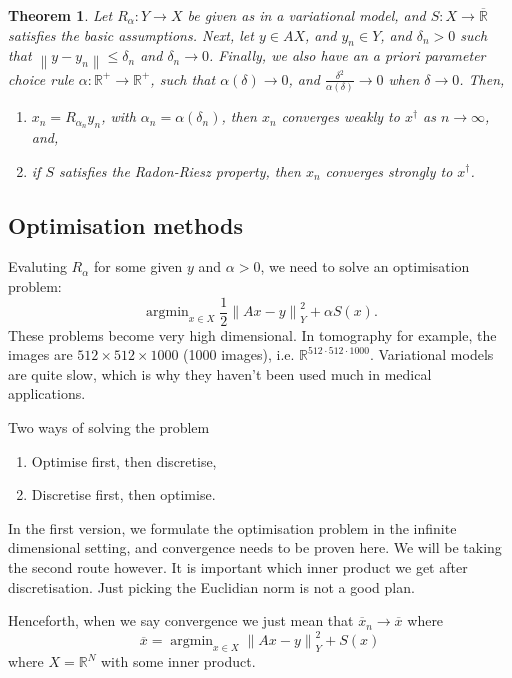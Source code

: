 \documentclass[12pt]{article}
\newtheorem{theorem}{Theorem}[section]
\theoremstyle{definition}
\newcommand{\real}{\mathbb{R}}   %
\DeclareMathOperator{\argmin}{argmin}
\newcommand\norm[1]{\left\lVert#1\right\rVert}
\begin{document}
\begin{theorem}
    Let $R_\alpha:Y\to X$ be given as in a variational model, and $S:X\to \overline{\real}$ satisfies the basic assumptions. Next, let $y\in AX$, and $y_n\in Y$, and $\delta_n>0$ such that $\norm{y-y_n}\leq \delta_n$ and $\delta_n\to 0$. Finally, we also have an a priori parameter choice rule $\alpha:\real^+\to \real^+$, such that $\alpha(\delta)\to 0$, and $\frac{\delta^2}{\alpha(\delta)}\to 0$ when $\delta \to 0$. Then, 
    \begin{enumerate}[label=(\alph*)]
        \item $x_n=R_{\alpha_n}y_n$, with $\alpha_n = \alpha(\delta_n)$, then $x_n$ converges weakly to $x^\dagger $ as $n\to \infty$, and,
        \item if $S$ satisfies the Radon-Riesz property, then $x_n$ converges strongly to $x^\dagger $.
    \end{enumerate}
\end{theorem}

\subsection{Optimisation methods}
Evaluting $R_\alpha$ for some given $y$ and $\alpha>0$, we need to solve an optimisation problem:
\begin{equation*}
    \argmin_{x\in X} \frac{1}{2}\norm{Ax-y}_Y^2 + \alpha S(x).
\end{equation*}
These problems become very high dimensional. In tomography for example, the images are $512\times 512\times 1000$ (1000 images), i.e. $\real^{512\cdot512\cdot1000}$. Variational models are quite slow, which is why they haven't been used much in medical applications.

Two ways of solving the problem
\begin{enumerate}
    \item Optimise first, then discretise,
    \item Discretise first, then optimise.
\end{enumerate}
In the first version, we formulate the optimisation problem in the infinite dimensional setting, and convergence needs to be proven here. We will be taking the second route however. It is important which inner product we get after discretisation. Just picking the Euclidian norm is not a good plan.


Henceforth, when we say convergence we just mean that $\overline{x}_n\to\overline{x}$ where 
\begin{equation*}
    \overline{x} = \argmin_{x\in X} \norm{Ax-y}_Y^2 + S(x)
\end{equation*}
where $X=\real^N$ with some inner product.
\end{document}
